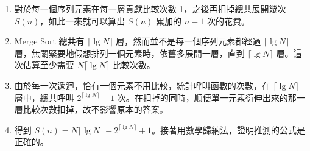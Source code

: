 \documentclass[11pt]{article}
\begin{document}
\begin{enumerate}
	\item 對於每一個序列元素在每一層貢獻比較次數 1，之後再扣掉總共展開幾次 $S(n)$，如此一來就可以算出 $S(n)$ 累加的 $n-1$ 次的花費。
	\item Merge Sort 總共有 $\lceil \lg N \rceil$ 層，然而並不是每一個序列元素都經過 $\lceil \lg N \rceil$ 層，無關緊要地假想排列一個元素時，依舊多展開一層，直到 $\lceil \lg N \rceil$ 層。這次估算至少需要 $N \lceil \lg N \rceil$ 比較次數。
	\item 由於每一次遞迴，恰有一個元素不用比較，統計呼叫函數的次數，在 $\lceil \lg N \rceil$ 層中，總共呼叫 $2^{\lceil \lg N \rceil} - 1$ 次。在扣掉的同時，順便單一元素衍伸出來的那一層比較次數扣掉，故不影響原本的答案。
	\item 得到 $S(n) = N \lceil \lg N \rceil - 2^{\lceil \lg N \rceil} + 1$。接著用數學歸納法，證明推測的公式是正確的。
\end{enumerate}
\end{document}
